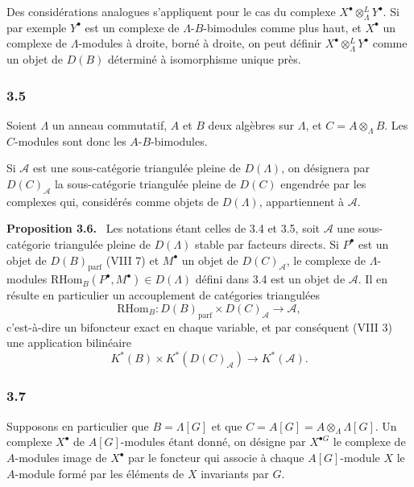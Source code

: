 \documentclass[11pt]{article}
\newenvironment{statement}[1]{\par\medskip\noindent\textbf{#1.}\ }{\par\medskip}
\providecommand{\RHom}{\mathrm{RHom}}
\providecommand{\parf}{\mathrm{parf}}
\providecommand{\RHom}{\mathrm{RHom}}
\providecommand{\RHom}{\mathrm R\mathcal{H}om}
\providecommand{\parf}{\mathrm{parf}}
\begin{document}
Des considérations analogues s'appliquent pour le cas du complexe $X^\bullet\otimes_\Lambda^L Y^\bullet$. Si par exemple $Y^\bullet$ est un complexe de $\Lambda$-$B$-bimodules comme plus haut, et $X^\bullet$ un complexe de $\Lambda$-modules à droite, borné à droite, on peut définir $X^\bullet\otimes_\Lambda^L Y^\bullet$ comme un objet de $D(B)$ déterminé à isomorphisme unique près.

\subsubsection*{3.5}

Soient $\Lambda$ un anneau commutatif, $A$ et $B$ deux algèbres sur $\Lambda$, et $C=A\otimes_{\Lambda}B$. Les $C$-modules sont donc les $A$-$B$-bimodules.

Si $\mathcal A$ est une sous-catégorie triangulée pleine de $D(\Lambda)$, on désignera par $D(C)_{\mathcal A}$ la sous-catégorie triangulée pleine de $D(C)$ engendrée par les complexes qui, considérés comme objets de $D(\Lambda)$, appartiennent à $\mathcal A$.

\begin{statement}{Proposition 3.6}
Les notations étant celles de 3.4 et 3.5, soit $\mathcal A$ une sous-catégorie triangulée pleine de $D(\Lambda)$ stable par facteurs directs. Si $P^\bullet$ est un objet de $D(B)_{\parf}$ (VIII 7) et $M^\bullet$ un objet de $D(C)_{\mathcal A}$, le complexe de $\Lambda$-modules $\RHom_B(P^\bullet,M^\bullet)\in D(\Lambda)$ défini dans 3.4 est un objet de $\mathcal A$. Il en résulte en particulier un accouplement de catégories triangulées
\[
\RHom_B:D(B)_{\parf}\times D(C)_{\mathcal A}\longrightarrow \mathcal A,
\tag{3.6.1}
\]
c'est-à-dire un bifoncteur exact en chaque variable, et par conséquent (VIII 3) une application bilinéaire
\[
K^*(B)\times K^*(D(C)_{\mathcal A})\longrightarrow K^*(\mathcal A).
\tag{3.6.2}
\]
\end{statement}

\subsubsection*{3.7}

Supposons en particulier que $B=\Lambda[G]$ et que $C=A[G]=A\otimes_\Lambda\Lambda[G]$. Un complexe $X^\bullet$ de $A[G]$-modules étant donné, on désigne par $X^{\bullet G}$ le complexe de $A$-modules image de $X^\bullet$ par le foncteur qui associe à chaque $A[G]$-module $X$ le $A$-module formé par les éléments de $X$ invariants par $G$.
\end{document}
